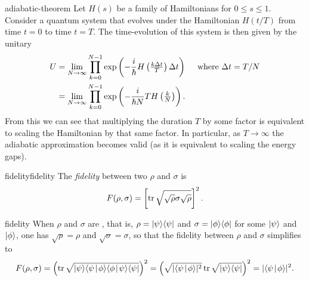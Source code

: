\begin{example}{adiabatic-theorem}
    Let $H(s)$ be a family of Hamiltonians for $0 \le s \le 1$. Consider a quantum system that evolves under the Hamiltonian $H(t/T)$ from time $t = 0$ to time $t = T$. The time-evolution of this system is then given by the unitary
    \[ \begin{aligned}
        U &= \lim_{N \to \infty} \prod_{k = 0}^{N - 1} \exp \left( - \frac{i}{\hbar} H \left(\tfrac{k \Delta t}{T} \right) \Delta t \right) \quad \textup{ where } \Delta t = T / N \\
        &= \lim_{N \to \infty} \prod_{k = 0}^{N - 1} \exp \left( - \frac{i}{\hbar N} T H \left(\tfrac{k}{N} \right) \right) . 
    \end{aligned} \]
    From this we can see that multiplying the duration $T$ by some factor is equivalent to scaling the Hamiltonian by that same factor. In particular, as $T \to \infty$ the adiabatic approximation becomes valid (as it is equivalent to scaling the energy gaps). 
\end{example}

\begin{topic}{fidelity}{fidelity}
    The \emph{fidelity} between two  $\rho$ and $\sigma$ is
    \[ F(\rho, \sigma) = \left[ \operatorname{tr} \sqrt{\sqrt{\rho} \sigma \sqrt{\rho}} \right]^2 . \]
\end{topic}

\begin{example}{fidelity}
    When $\rho$ and $\sigma$ are , that is, $\rho = |\psi\rangle \langle\psi|$ and $\sigma = |\phi\rangle \langle\phi|$ for some $|\psi\rangle$ and $|\phi\rangle$, one has $\sqrt{\rho} = \rho$ and $\sqrt{\sigma} = \sigma$, so that the fidelity between $\rho$ and $\sigma$ simplifies to
    \[ F(\rho, \sigma) = \left( \tr \sqrt{\ket{\psi} \braket{\psi}{\phi} \braket{\phi}{\psi} \bra{\psi}} \right)^2 = \left( \sqrt{|\braket{\psi}{\phi}|^2} \tr \sqrt{\ket{\psi} \bra{\psi}} \right)^2 = |\braket{\psi}{\phi}|^2 . \]
\end{example}
